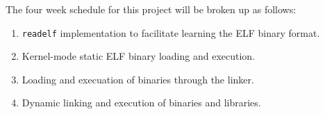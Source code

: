\documentclass{article}
\begin{document}
\begin{CJK}{UTF8}{goth}
The four week schedule for this project will be broken up as follows:

\begin{enumerate}
    \item \texttt{readelf} implementation to facilitate learning the ELF binary format.
    \item Kernel-mode static ELF binary loading and execution.
    \item Loading and execuation of binaries through the linker.
    \item Dynamic linking and execution of binaries and libraries.
\end{enumerate}



\end{CJK}
\end{document}
